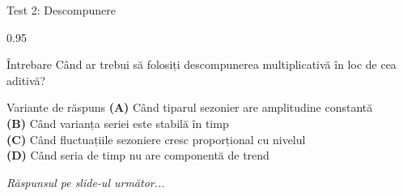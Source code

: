 \documentclass[9pt, aspectratio=169, t]{beamer}
\begin{document}
\begin{frame}{Test 2: Descompunere}
    \begin{cminipage}{0.95\textwidth}
    \begin{alertblock}{Întrebare}
        Când ar trebui să folosiți descompunerea multiplicativă în loc de cea aditivă?
    \end{alertblock}

    \vspace{0.4cm}

    \begin{block}{Variante de răspuns}
    \textcolor{MainBlue}{\textbf{(A)}} Când tiparul sezonier are amplitudine constantă\\[3pt]
    \textcolor{MainBlue}{\textbf{(B)}} Când varianța seriei este stabilă în timp\\[3pt]
    \textcolor{MainBlue}{\textbf{(C)}} Când fluctuațiile sezoniere cresc proporțional cu nivelul\\[3pt]
    \textcolor{MainBlue}{\textbf{(D)}} Când seria de timp nu are componentă de trend
    \end{block}
    \vspace{0.5cm}

    \begin{center}
        \textit{Răspunsul pe slide-ul următor...}
    \end{center}
    \end{cminipage}
\end{frame}
\end{document}
